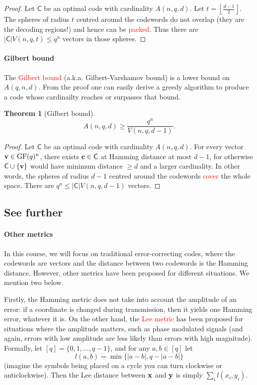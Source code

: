 \documentclass[a4paper, 11pt, openany]{book}
\numberwithin{equation}{section}
\theoremstyle{plain}
\newtheorem{theorem}	[equation]	{Theorem}
\theoremstyle{definition}
\newcommand{\GF}{\mathrm{GF}}
\newcommand{\Important}[1]{\textcolor{red}{#1}}
\newcommand{\code}[1]{\mathsf{#1}}
\begin{document}
\begin{proof}
Let $\code{C}$ be an optimal code with cardinality $A(n,q,d)$. Let $t = \left\lfloor \frac{d-1}{2} \right\rfloor$. The spheres of radius $t$ centred around the codewords do not overlap (they are the decoding regions!) and hence can be \Important{packed}. Thus there are $|\code{C}| V(n,q,t) \le q^n$ vectors in those spheres.
\end{proof}

\paragraph{Gilbert bound}
The \Important{Gilbert bound} (a.k.a. Gilbert-Varshamov bound) is a lower bound on $A(q,n,d)$. From the proof one can easily derive a greedy algorithm to produce a code whose cardinailty reaches or surpasses that bound.

\begin{theorem}[Gilbert bound]
\[
	A(n,q,d) \ge \frac{ q^n }{ V(n, q, d-1 ) }.
\]
\end{theorem}

\begin{proof}
Let $\code{C}$ be an optimal code with cardinality $A(n,q,d)$. For every vector ${\bf v} \in \GF(q)^n$, there exists ${\bf c} \in \code{C}$ at Hamming distance at most $d-1$, for otherwise $\code{C} \cup \{ {\bf v} \}$ would have minimum distance $\ge d$ and a larger cardinality. In other words, the spheres of radius $d-1$ centred around the codewords \Important{cover} the whole space. There are $q^n \le |\code{C}| V(n,q,d-1)$ vectors.
\end{proof}


\subsection{See further}

\paragraph{Other metrics}
In this course, we will focus on traditional error-correcting codes, where the codewords are vectors and the distance between two codewords is the Hamming distance. However, other metrics have been proposed for different situations. We mention two below.

Firstly, the Hamming metric does not take into account the amplitude of an error: if a coordinate is changed during transmission, then it yields one Hamming error, whatever it is. On the other hand, the \Important{Lee metric} has been proposed for situations where the amplitude matters, such as phase modulated signals (and again, errors with low amplitude are less likely than errors with high magnitude). Formally, let $[q] = \{0, 1, \dots, q-1\}$, and for any $a,b \in [q]$ let
\[
    l(a,b) = \min\{ |a - b|, q - |a - b| \}
\]
(imagine the symbols being placed on a cycle you can turn clockwise or anticlockwise). Then the Lee distance between ${\bf x}$ and ${\bf y}$ is simply $\sum_i l(x_i,y_i)$.
\end{document}
